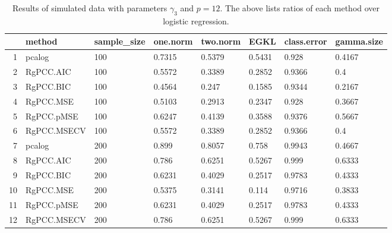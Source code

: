 \begin{table}[ht]
\centering
\begin{tabular}{rlllllll}
  \hline
 & method & sample\_size & one.norm & two.norm & EGKL & class.error & gamma.size \\ 
  \hline
1 & pcalog & 100 & 0.7315 & 0.5379 & 0.5431 & 0.928 & 0.4167 \\ 
  2 & RgPCC.AIC & 100 & 0.5572 & 0.3389 & 0.2852 & 0.9366 & 0.4 \\ 
  3 & RgPCC.BIC & 100 & 0.4564 & 0.247 & 0.1585 & 0.9344 & 0.2167 \\ 
  4 & RgPCC.MSE & 100 & 0.5103 & 0.2913 & 0.2347 & 0.928 & 0.3667 \\ 
  5 & RgPCC.pMSE & 100 & 0.6247 & 0.4139 & 0.3588 & 0.9376 & 0.5667 \\ 
  6 & RgPCC.MSECV & 100 & 0.5572 & 0.3389 & 0.2852 & 0.9366 & 0.4 \\ 
  7 & pcalog & 200 & 0.899 & 0.8057 & 0.758 & 0.9943 & 0.4667 \\ 
  8 & RgPCC.AIC & 200 & 0.786 & 0.6251 & 0.5267 & 0.999 & 0.6333 \\ 
  9 & RgPCC.BIC & 200 & 0.6231 & 0.4029 & 0.2517 & 0.9783 & 0.4333 \\ 
  10 & RgPCC.MSE & 200 & 0.5375 & 0.3141 & 0.114 & 0.9716 & 0.3833 \\ 
  11 & RgPCC.pMSE & 200 & 0.6231 & 0.4029 & 0.2517 & 0.9783 & 0.4333 \\ 
  12 & RgPCC.MSECV & 200 & 0.786 & 0.6251 & 0.5267 & 0.999 & 0.6333 \\ 
   \hline
\end{tabular}
\caption{Results of simulated data with parameters $\gamma_3$ and $p =12$. The above lists ratios of each method over logistic regression.} 
\label{fig-3-lead-12-metrics-pratio}
\end{table}
